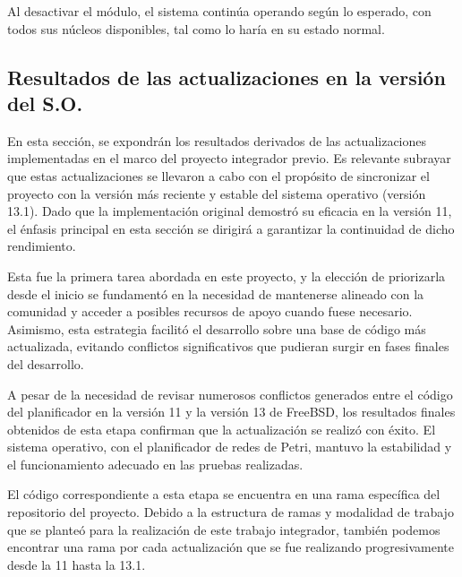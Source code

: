 Al desactivar el módulo, el sistema continúa operando según lo esperado, con todos sus núcleos disponibles, tal como lo haría en su estado normal.


\subsection{Resultados de las actualizaciones en la versión del S.O.}
En esta sección, se expondrán los resultados derivados de las actualizaciones implementadas en el marco del proyecto integrador previo. Es relevante subrayar que estas actualizaciones se llevaron a cabo con el propósito de sincronizar el proyecto con la versión más reciente y estable del sistema operativo (versión 13.1). Dado que la implementación original demostró su eficacia en la versión 11, el énfasis principal en esta sección se dirigirá a garantizar la continuidad de dicho rendimiento.\par

Esta fue la primera tarea abordada en este proyecto, y la elección de priorizarla desde el inicio se fundamentó en la necesidad de mantenerse alineado con la comunidad y acceder a posibles recursos de apoyo cuando fuese necesario. Asimismo, esta estrategia facilitó el desarrollo sobre una base de código más actualizada, evitando conflictos significativos que pudieran surgir en fases finales del desarrollo.\par

A pesar de la necesidad de revisar numerosos conflictos generados entre el código del planificador en la versión 11 y la versión 13 de FreeBSD, los resultados finales obtenidos de esta etapa confirman que la actualización se realizó con éxito. El sistema operativo, con el planificador de redes de Petri, mantuvo la estabilidad y el funcionamiento adecuado en las pruebas realizadas.\par

El código correspondiente a esta etapa se encuentra en una rama específica del repositorio del proyecto. Debido a la estructura de ramas y modalidad de trabajo que se planteó para la realización de este trabajo integrador, también podemos encontrar una rama por cada actualización que se fue realizando progresivamente desde la 11 hasta la 13.1.\par



